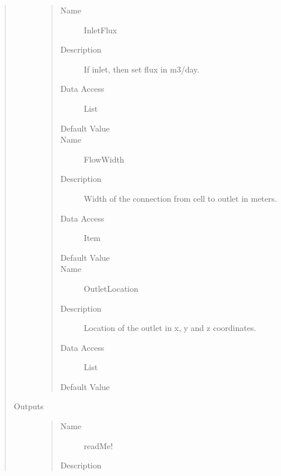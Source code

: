 \documentclass[letterpaper,10pt,english]{sphinxmanual}
\begin{document}
\begin{quote}
\begin{description}
\begin{quote}
\begin{description}
\item[{Name}] \leavevmode
InletFlux

\item[{Description}] \leavevmode
If inlet, then set flux in m3/day.

\item[{Data Access}] \leavevmode
List

\item[{Default Value}] \leavevmode
{}

\item[{Name}] \leavevmode
FlowWidth

\item[{Description}] \leavevmode
Width of the connection from cell to outlet in meters.

\item[{Data Access}] \leavevmode
Item

\item[{Default Value}] \leavevmode
{}

\item[{Name}] \leavevmode
OutletLocation

\item[{Description}] \leavevmode
Location of the outlet in x, y and z coordinates.

\item[{Data Access}] \leavevmode
List

\item[{Default Value}] \leavevmode
{}

\end{description}\end{quote}

\item[{Outputs}] \leavevmode\begin{quote}\begin{description}
\item[{Name}] \leavevmode
readMe!

\item[{Description}] \leavevmode
{}


\end{description}
\end{quote}
\end{description}
\end{quote}
\end{document}
